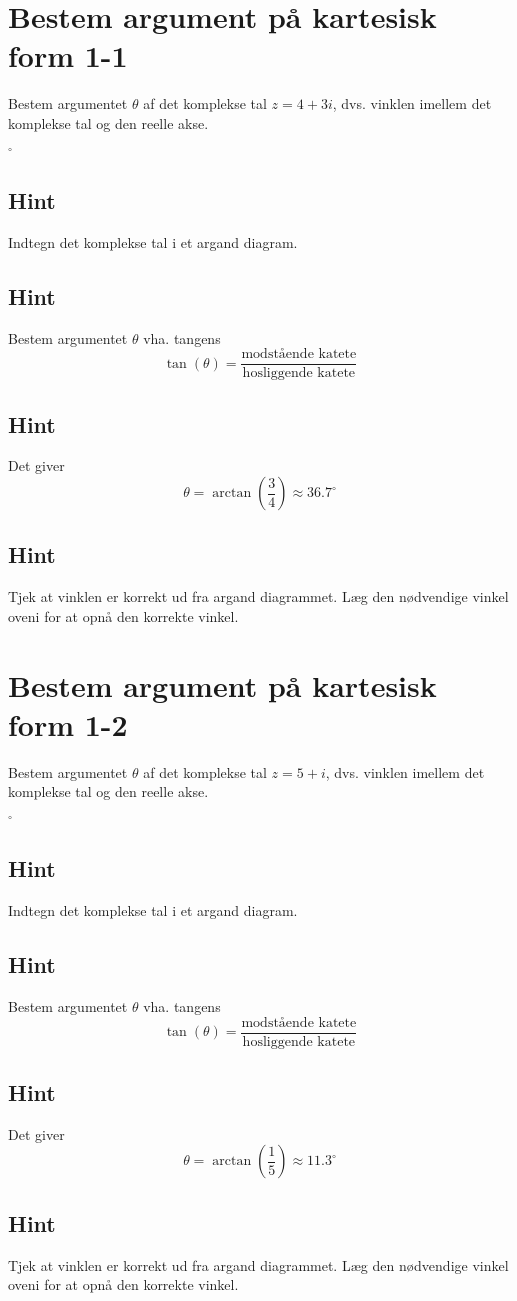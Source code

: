 \documentclass{article}
\newenvironment{exercise}[1]{\newpage\section{#1}}{}
\newcommand{\answerbox}[1]{\fbox{$#1$}}
\newcommand{\hint}{\subsection*{Hint}}
\begin{document}
\tableofcontents
\newpage

\begin{exercise}{Bestem argument på kartesisk form 1-1}

Bestem argumentet $\theta$ af det komplekse tal $z=4+3i$, dvs. vinklen imellem det komplekse tal og den reelle akse.

\answerbox{37.7}$^\circ$


\hint 

Indtegn det komplekse tal i et argand diagram.


\hint

Bestem argumentet $\theta$ vha. tangens
\[
\tan(\theta)=\frac{\textrm{modstående katete}}{\textrm{hosliggende katete}}
\]

\hint 

Det giver
\[
\theta = \arctan \left(\frac{3}{4}\right) \approx 36.7^\circ
\]

\hint

Tjek at vinklen er korrekt ud fra argand diagrammet. Læg den nødvendige vinkel oveni for at opnå den korrekte vinkel. 


\end{exercise}

\newpage

\begin{exercise}{Bestem argument på kartesisk form 1-2}
	
	Bestem argumentet $\theta$ af det komplekse tal $z=5+i$, dvs. vinklen imellem det komplekse tal og den reelle akse.
	
	\answerbox{11.3}$^\circ$
	
	
	\hint 
	
	Indtegn det komplekse tal i et argand diagram.
	
	
	\hint
	
	Bestem argumentet $\theta$ vha. tangens
	\[
	\tan(\theta)=\frac{\textrm{modstående katete}}{\textrm{hosliggende katete}}
	\]
	
	\hint 
	
	Det giver
	\[
	\theta = \arctan \left(\frac{1}{5}\right) \approx 11.3^\circ
	\]
	
	\hint
	
	Tjek at vinklen er korrekt ud fra argand diagrammet. Læg den nødvendige vinkel oveni for at opnå den korrekte vinkel. 
	
	
\end{exercise}

\newpage
\end{document}
